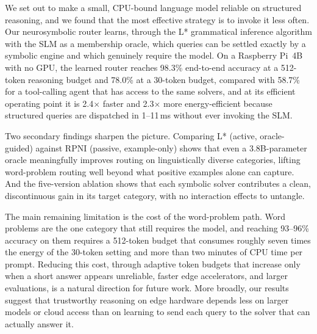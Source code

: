 \documentclass[journal]{IEEEtai}
\begin{document}
We set out to make a small, CPU-bound language model reliable on structured reasoning, and we found that the most effective strategy is to invoke it less often. Our neurosymbolic router learns, through the L* grammatical inference algorithm with the SLM as a membership oracle, which queries can be settled exactly by a symbolic engine and which genuinely require the model. On a Raspberry Pi~4B with no GPU, the learned router reaches 98.3\% end-to-end accuracy at a 512-token reasoning budget and 78.0\% at a 30-token budget, compared with 58.7\% for a tool-calling agent that has access to the same solvers, and at its efficient operating point it is 2.4$\times$ faster and 2.3$\times$ more energy-efficient because structured queries are dispatched in 1--11\,ms without ever invoking the SLM.

Two secondary findings sharpen the picture. Comparing L* (active, oracle-guided) against RPNI (passive, example-only) shows that even a 3.8B-parameter oracle meaningfully improves routing on linguistically diverse categories, lifting word-problem routing well beyond what positive examples alone can capture. And the five-version ablation shows that each symbolic solver contributes a clean, discontinuous gain in its target category, with no interaction effects to untangle.

The main remaining limitation is the cost of the word-problem path. Word problems are the one category that still requires the model, and reaching 93--96\% accuracy on them requires a 512-token budget that consumes roughly seven times the energy of the 30-token setting and more than two minutes of CPU time per prompt. Reducing this cost, through adaptive token budgets that increase only when a short answer appears unreliable, faster edge accelerators, and larger evaluations, is a natural direction for future work. More broadly, our results suggest that trustworthy reasoning on edge hardware depends less on larger models or cloud access than on learning to send each query to the solver that can actually answer it.




\end{document}
